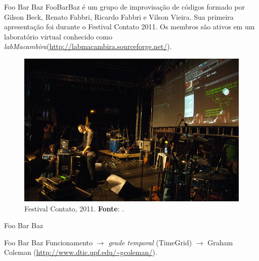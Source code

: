 \documentclass[aspectratio=169]{beamer}
\begin{document}

\begin{frame}[allowframebreaks]{Foo Bar Baz}
FooBarBaz é um grupo de improvisação de códigos formado por Gilson Beck, Renato Fabbri, Ricardo Fabbri e Vilson Vieira. Sua primeira apresentação foi durante o Festival Contato 2011. Os membros são ativos em um laboratório virtual conhecido como \emph{labMacambira}(\url{http://labmacambira.sourceforge.net/}).

\begin{figure}[!h]
  \centering
  \includegraphics[scale=0.45]{imagens/Foobarbaz1.jpg}
  \caption{Festival Contato, 2011. \textbf{Fonte}: .}
  \label{fig:foobarbaz}
\end{figure}
\end{frame}

\begin{frame}{Foo Bar Baz}
\chuck
\end{frame}


\begin{frame}{Foo Bar Baz}
Funcionamento $\rightarrow$ \emph{grade temporal} (TimeGrid) $\rightarrow$  Graham Coleman (\url{http://www.dtic.upf.edu/~gcoleman/}).
\end{frame}
\end{document}
